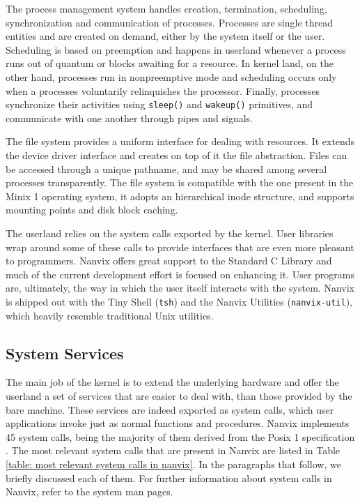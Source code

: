 \documentclass[10pt,a4paper]{article}
\begin{document}
The process management system handles creation, termination, scheduling, synchronization and communication of processes. Processes are single thread entities and are created on demand, either by the system itself or the user. Scheduling is based on preemption and happens in userland whenever a process runs out of quantum or blocks awaiting for a resource. In kernel land, on the other hand, processes run in nonpreemptive mode and scheduling occurs only when a processes voluntarily relinquishes the processor. Finally, processes synchronize their activities using \texttt{sleep()} and \texttt{wakeup()} primitives, and communicate with one another through pipes and signals.

The file system provides a uniform interface for dealing with resources. It extends the device driver interface and creates on top of it the file abstraction. Files can be accessed through a unique pathname, and may be shared among several processes transparently.   The file system is compatible with the one present in the Minix 1 operating system, it adopts an hierarchical inode structure, and supports mounting points and disk block caching.

The userland relies on the system calls exported by the kernel. User libraries wrap around some of these calls to provide interfaces that are even more pleasant to programmers. Nanvix offers great support to the Standard C Library and much of the current development effort is focused on enhancing it. User programs are, ultimately, the way in which the user itself interacts with the system. Nanvix is shipped out with the Tiny Shell (\texttt{tsh}) and the Nanvix Utilities (\texttt{nanvix-util}), which heavily resemble traditional Unix utilities. 

\subsection{System Services}
\label{section: system services}

The main job of the kernel is to extend the underlying hardware and offer the userland a set of services that are easier to deal with, than those provided by the bare machine. These services are indeed exported as system calls, which user applications invoke just as normal functions and procedures. Nanvix implements 45 system calls, being the majority of them derived from the Posix 1 specification \cite{IEEE:08}. The most relevant system calls that are present in Nanvix are listed in Table \ref{table: most relevant system calls in nanvix}. In the paragraphs that follow, we briefly discussed each of them. For further information about system calls in Nanvix, refer to the system man pages.
\end{document}
